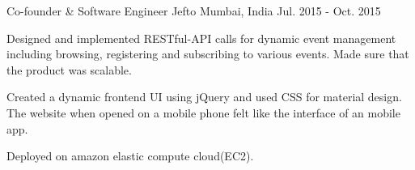 

\begin{cventries}
  
  \cventry
    {Co-founder \& Software Engineer} %
    {Jefto} %
    {Mumbai, India} %
    {Jul. 2015 - Oct. 2015} %
    {
      \begin{cvitems} %
        \item {Designed and implemented RESTful-API calls for dynamic event management including browsing, registering and subscribing to various events. Made sure that the product was scalable. }
        \item {Created a dynamic frontend UI using jQuery and used CSS for material design. The website when opened on a mobile phone felt like the interface of an mobile app.}
        \item {Deployed on amazon elastic compute cloud(EC2). }
      \end{cvitems}
    }

\end{cventries}



